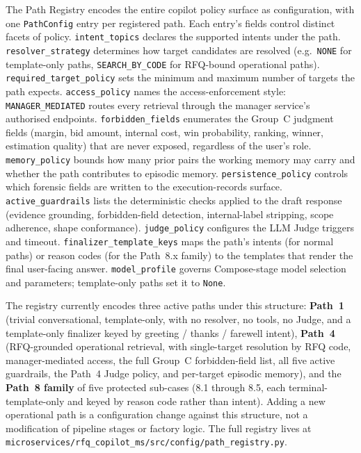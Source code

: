 The Path Registry encodes the entire copilot policy surface as configuration, with one \texttt{PathConfig} entry per registered path. Each entry's fields control distinct facets of policy. \texttt{intent\_topics} declares the supported intents under the path. \texttt{resolver\_strategy} determines how target candidates are resolved (e.g.\ \texttt{NONE} for template-only paths, \texttt{SEARCH\_BY\_CODE} for RFQ-bound operational paths). \texttt{required\_target\_policy} sets the minimum and maximum number of targets the path expects. \texttt{access\_policy} names the access-enforcement style: \texttt{MANAGER\_MEDIATED} routes every retrieval through the manager service's authorised endpoints. \texttt{forbidden\_fields} enumerates the Group~C judgment fields (margin, bid amount, internal cost, win probability, ranking, winner, estimation quality) that are never exposed, regardless of the user's role. \texttt{memory\_policy} bounds how many prior pairs the working memory may carry and whether the path contributes to episodic memory. \texttt{persistence\_policy} controls which forensic fields are written to the execution-records surface. \texttt{active\_guardrails} lists the deterministic checks applied to the draft response (evidence grounding, forbidden-field detection, internal-label stripping, scope adherence, shape conformance). \texttt{judge\_policy} configures the LLM Judge triggers and timeout. \texttt{finalizer\_template\_keys} maps the path's intents (for normal paths) or reason codes (for the Path~8.x family) to the templates that render the final user-facing answer. \texttt{model\_profile} governs Compose-stage model selection and parameters; template-only paths set it to \texttt{None}.

The registry currently encodes three active paths under this structure: \textbf{Path~1} (trivial conversational, template-only, with no resolver, no tools, no Judge, and a template-only finalizer keyed by greeting / thanks / farewell intent), \textbf{Path~4} (RFQ-grounded operational retrieval, with single-target resolution by RFQ code, manager-mediated access, the full Group~C forbidden-field list, all five active guardrails, the Path~4 Judge policy, and per-target episodic memory), and the \textbf{Path~8 family} of five protected sub-cases (8.1 through 8.5, each terminal-template-only and keyed by reason code rather than intent). Adding a new operational path is a configuration change against this structure, not a modification of pipeline stages or factory logic. The full registry lives at \texttt{microservices/rfq\_copilot\_ms/src/config/path\_registry.py}.

